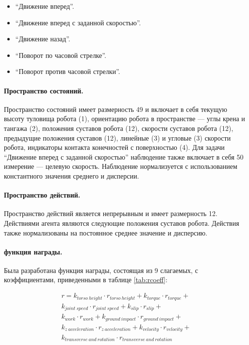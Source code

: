 \begin{itemize}
    \item ``Движение вперед''.
	\item ``Движение вперед с заданной скоростью''.
    \item ``Движение назад''.
    \item ``Поворот по часовой стрелке''.
    \item ``Поворот против часовой стрелки''.
\end{itemize}

\paragraph{Пространство состояний.} Пространство состояний имеет размерность 49 и включает в себя текущую высоту туловища робота (1), ориентацию робота в пространстве --- углы крена и тангажа (2), положения суставов робота (12), скорости суставов робота (12), предыдущие положения суставов (12), линейные (3) и угловые (3) скорости робота, индикаторы контакта конечностей с поверхностью (4). Для задачи ``Движение вперед с заданной скоростью'' наблюдение также включает в себя 50 измерение ---  целевую скорость. Наблюдение нормализуется с использованием константного значения среднего и дисперсии.

\paragraph{Пространство действий.} Пространство действий является непрерывным и имеет размерность 12. Действиями агента являются следующие положения суставов робота. Действия также нормализованы на постоянное среднее значение и дисперсию.  

\paragraph{функция награды.} Была разработана функция награды, состоящая из 9 слагаемых, с коэффициентами, приведенными в таблице \ref{tab:rcoeff}:

\begin{multline}
    r = k_{torso\ height} \cdot r_{torso\ height} +
    k_{torque} \cdot r_{torque} +\\
    k_{joint\ speed} \cdot r_{joint\ speed} +
    k_{slip} \cdot r_{slip} +\\
    k_{work} \cdot r_{work} + 
    k_{ground\ impact} \cdot r_{ground\ impact} +\\
    k_{z\ acceleration} \cdot r_{z\ acceleration} +  k_{velocity} \cdot r_{velocity} +\\
    k_{transverse\ and\ rotation} \cdot r_{transverse\ and\ rotation}
\label{eq:unitree_reward}
\end{multline}


